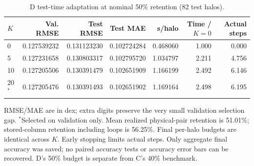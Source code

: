 \begin{table}[t]
\centering
\small
\caption{D test-time adaptation at nominal 50\% retention (82 test halos).}
\label{tab:cosmic-5}
\setlength{\tabcolsep}{4pt}
\begin{tabular}{lrrrrrr}
\toprule
$K$ & Val. RMSE & Test RMSE & Test MAE & s/halo & Time / $K=0$ & Actual steps \\
\midrule
0 & 0.127539232 & 0.131123230 & 0.102724284 & 0.468060 & 1.000 & 0.000 \\
5 & 0.127231658 & 0.130803317 & 0.102795720 & 1.034797 & 2.211 & 4.756 \\
10 & 0.127205506 & 0.130391479 & 0.102651909 & 1.166199 & 2.492 & 6.146 \\
20$^*$ & 0.127205476 & 0.130391493 & 0.102651902 & 1.169164 & 2.498 & 6.195 \\
\bottomrule
\end{tabular}
\par\smallskip
\begin{minipage}{0.98\textwidth}
\footnotesize RMSE/MAE are in dex; extra digits preserve the very small validation selection gap. $^*$Selected on validation only. Mean realized physical-pair retention is 51.01\%; stored-column retention including loops is 56.25\%. Final per-halo budgets are identical across $K$. Early stopping limits actual steps. Only aggregate final accuracy was saved; no paired accuracy tests or accuracy error bars can be recovered. D's 50\% budget is separate from C's 40\% benchmark.
\end{minipage}
\end{table}

